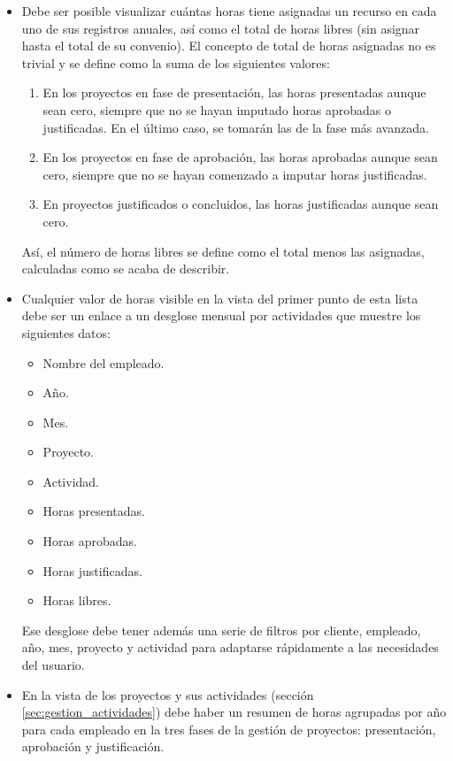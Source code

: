 \begin{itemize}
\item Debe ser posible visualizar cuántas horas tiene asignadas un recurso en
cada uno de sus registros anuales, así como el total de horas libres (sin
asignar hasta el total de su convenio). El concepto de total de horas asignadas
no es trivial y se define como la suma de los siguientes valores:
 
\begin{enumerate}
  \item En los proyectos en fase de presentación, las horas presentadas aunque
sean cero, siempre que no se hayan imputado horas aprobadas o justificadas. En
el último caso, se tomarán las de la fase más avanzada.
  \item En los proyectos en fase de aprobación, las horas aprobadas aunque sean
cero, siempre que no se hayan comenzado a imputar horas justificadas.
  \item En proyectos justificados o concluidos, las horas justificadas aunque
sean cero.
\end{enumerate}

Así, el número de horas libres se define como el total menos las asignadas,
calculadas como se acaba de describir.

\item Cualquier valor de horas visible en la vista del primer punto de esta
lista debe ser un enlace a un desglose mensual por actividades que muestre los
siguientes datos:
 \begin{itemize}
  \item Nombre del empleado.
  \item Año.
  \item Mes.
  \item Proyecto.
  \item Actividad.
  \item Horas presentadas.
  \item Horas aprobadas.
  \item Horas justificadas.
  \item Horas libres.
 \end{itemize}
Ese desglose debe tener además una serie de filtros por cliente, empleado, año,
mes, proyecto y actividad para adaptarse rápidamente a las necesidades del
usuario.

\item En la vista de los proyectos y sus actividades (sección
\ref{sec:gestion_actividades}) debe haber un resumen de horas agrupadas por año
para cada empleado en la tres fases de la gestión de proyectos: presentación,
aprobación y justificación.


\end{itemize}
